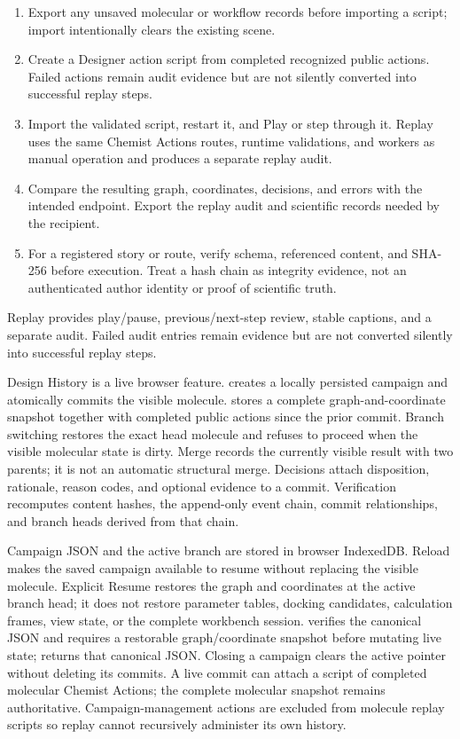 \documentclass[11pt]{article}
\begin{document}
\begin{enumerate}
\item Export any unsaved molecular or workflow records before importing a script; import intentionally clears the existing scene.
\item Create a Designer action script from completed recognized public actions. Failed actions remain audit evidence but are not silently converted into successful replay steps.
\item Import the validated script, restart it, and Play or step through it. Replay uses the same Chemist Actions routes, runtime validations, and workers as manual operation and produces a separate replay audit.
\item Compare the resulting graph, coordinates, decisions, and errors with the intended endpoint. Export the replay audit and scientific records needed by the recipient.
\item For a registered story or route, verify schema, referenced content, and SHA-256 before execution. Treat a hash chain as integrity evidence, not an authenticated author identity or proof of scientific truth.
\end{enumerate}

Replay provides play/pause, previous/next-step review, stable captions, and a separate audit. Failed audit entries remain evidence but are not converted silently into successful replay steps.


Design History is a live browser feature.  creates a locally persisted campaign and atomically commits the visible molecule.  stores a complete graph-and-coordinate snapshot together with completed public actions since the prior commit. Branch switching restores the exact head molecule and refuses to proceed when the visible molecular state is dirty. Merge records the currently visible result with two parents; it is not an automatic structural merge. Decisions attach disposition, rationale, reason codes, and optional evidence to a commit. Verification recomputes content hashes, the append-only event chain, commit relationships, and branch heads derived from that chain.

Campaign JSON and the active branch are stored in browser IndexedDB. Reload makes the saved campaign available to resume without replacing the visible molecule. Explicit Resume restores the graph and coordinates at the active branch head; it does not restore parameter tables, docking candidates, calculation frames, view state, or the complete workbench session.  verifies the canonical JSON and requires a restorable graph/coordinate snapshot before mutating live state;  returns that canonical JSON. Closing a campaign clears the active pointer without deleting its commits. A live commit can attach a script of completed molecular Chemist Actions; the complete molecular snapshot remains authoritative. Campaign-management actions are excluded from molecule replay scripts so replay cannot recursively administer its own history.
\end{document}
